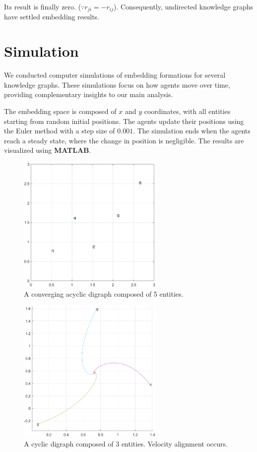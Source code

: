 \documentclass[letterpaper, 10 pt, conference]{ieeeconf}  %
\begin{document}
\noindent Its result is finally zero. (\(\because r_{ji} = -r_{ij}\)). Consequently, undirected knowledge graphs have settled embedding results. 

\section{Simulation}
We conducted computer simulations of embedding formations for several knowledge graphs. These simulations focus on how agents move over time, providing complementary insights to our main analysis.

The embedding space is composed of \(x\) and \(y\) coordinates, with all entities starting from random initial positions. The agents update their positions using the Euler method with a step size of \(0.001\). The simulation ends when the agents reach a steady state, where the change in position is negligible. The results are visualized using \textbf{MATLAB}.

\begin{figure}[thb]
    \begin{center}
    \includegraphics[width=7cm]{IMG/AG_simul3.png}
    \caption{A converging acyclic digraph composed of 5 entities.}
    \label{fig:DAGstate}
    \end{center}
    \vspace{-3mm}
\end{figure}

\begin{figure}[thb]
    \begin{center}
    \includegraphics[width=7cm]{IMG/node3_velo_align_4.png}
    \caption{A cyclic digraph composed of 3 entities. Velocity alignment occurs.}
    \label{fig:velo_align}
    \end{center}
    \vspace{-0mm}
\end{figure}
\end{document}

